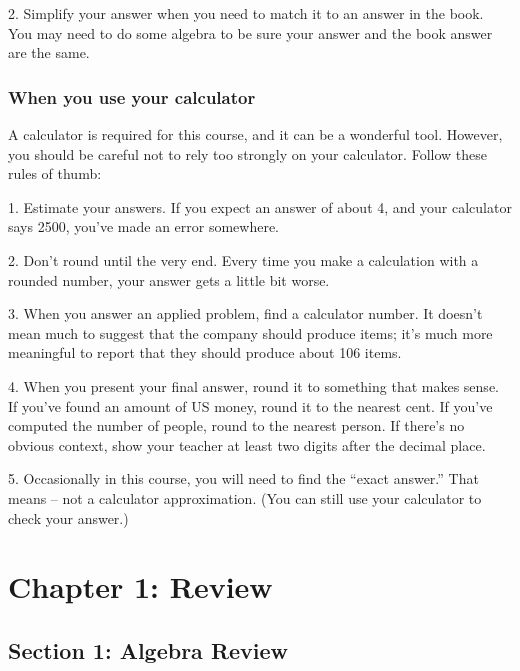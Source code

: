 2. Simplify your answer when you need to match it to an answer in the
book. You may need to do some algebra to be sure your answer and the
book answer are the same.

\subsubsection{When you use your
calculator}\label{when-you-use-your-calculator}

A calculator is required for this course, and it can be a wonderful
tool. However, you should be careful not to rely too strongly on your
calculator. Follow these rules of thumb:

1. Estimate your answers. If you expect an answer of about 4, and your
calculator says 2500, you've made an error somewhere.

2. Don't round until the very end. Every time you make a calculation
with a rounded number, your answer gets a little bit worse.

3. When you answer an applied problem, find a calculator number. It
doesn't mean much to suggest that the company should produce items; it's
much more meaningful to report that they should produce about 106 items.

4. When you present your final answer, round it to something that makes
sense. If you've found an amount of US money, round it to the nearest
cent. If you've computed the number of people, round to the nearest
person. If there's no obvious context, show your teacher at least two
digits after the decimal place.

5. Occasionally in this course, you will need to find the ``exact
answer.'' That means -- not a calculator approximation. (You can still
use your calculator to check your answer.)

\hypertarget{section}{\section{}\label{section}}

\section{Chapter 1: Review}\label{chapter-1-review}

\hypertarget{section-1-algebra-review}{\subsection{Section 1: Algebra
Review}\label{section-1-algebra-review}}

